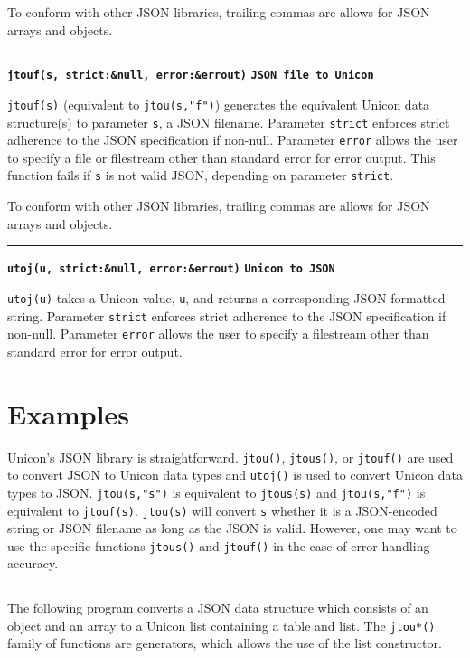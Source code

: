 \documentclass[letterpaper,12pt]{article}
\begin{document}
To conform with other JSON libraries, trailing commas are allows for JSON arrays
and objects.

\bigskip
\hrule\vspace{0.1cm}
\noindent
{\tt\bf jtouf(s, strict:\&null, error:\&errout)} \hfill {\tt\bf JSON file to Unicon}

\vspace{0.1cm}
\noindent
\texttt{jtouf(s)} (equivalent to \texttt{jtou(s,"f")}) generates the 
equivalent Unicon data structure(s) to parameter \texttt{s}, a JSON filename. 
Parameter \texttt{strict} enforces strict adherence to the JSON specification 
if non-null.
Parameter \texttt{error} allows the user to specify a file or filestream other 
than standard error for error output. 
This function fails if \texttt{s} is not valid JSON, depending on parameter 
\texttt{strict}.

To conform with other JSON libraries, trailing commas are allows for JSON arrays
and objects.

\bigskip
\hrule\vspace{0.1cm}
\noindent
{\tt\bf utoj(u, strict:\&null, error:\&errout)} \hfill {\tt\bf Unicon to JSON}

\vspace{0.1cm}
\noindent
\texttt{utoj(u)} takes a Unicon value, \texttt{u}, and returns a corresponding 
JSON-formatted string. 
Parameter \texttt{strict} enforces strict adherence to the JSON specification 
if non-null.
Parameter \texttt{error} allows the user to specify a filestream other than 
standard error for error output. 

\pagebreak
\section{Examples}

Unicon's JSON library is straightforward. \texttt{jtou()}, \texttt{jtous()},
or \texttt{jtouf()} are used to convert JSON to Unicon data types and 
\texttt{utoj()} is used to convert Unicon data types to JSON. 
\texttt{jtou(s,"s")} is equivalent to \texttt{jtous(s)} and \texttt{jtou(s,"f")}
is equivalent to \texttt{jtouf(s)}. \texttt{jtou(s)} will convert \texttt{s}
whether it is a JSON-encoded string or JSON filename as long as the JSON is
valid. However, one may want to use the specific functions \texttt{jtous()}
and \texttt{jtouf()} in the case of error handling accuracy. 

\bigskip
\hrule\vspace{0.1cm}
\bigskip
\noindent
The following program converts a JSON data structure which
consists of an object and an array to a Unicon list containing a table and
list. The \texttt{jtou*()} family of functions are generators, which allows
the use of the list constructor.
\end{document}
